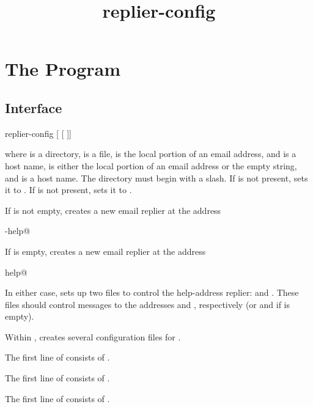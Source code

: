 \documentclass{book}
\title{replier-config}
\begin{document}
\section{The  Program}

\subsection{Interface}
\begin{code}%
  replier-config     [  [  ]]
\end{code}
where  is a directory,  is a  file,
 is the local portion of an email address, and 
is a host name,  is either the local portion of an
email address or the empty string, and  is a host name.
The directory  must begin with a slash.
If  is not present,  sets it to
.  If  is not present, 
sets it to .

If  is not empty,  creates a new
email replier at the address
\begin{code}%
  -help@
\end{code}

If  is empty,  creates a new email
replier at the address
\begin{code}%
  help@
\end{code}

In either case,  sets up two  files to
control the help-address replier:  and
.  These files should control messages
to the addresses  and
, respectively (or
 and  if
 is empty).

Within ,  creates several configuration
files for .

The first line of  consists of .

The first line of  consists of .

The first line of  consists of .
\end{document}
